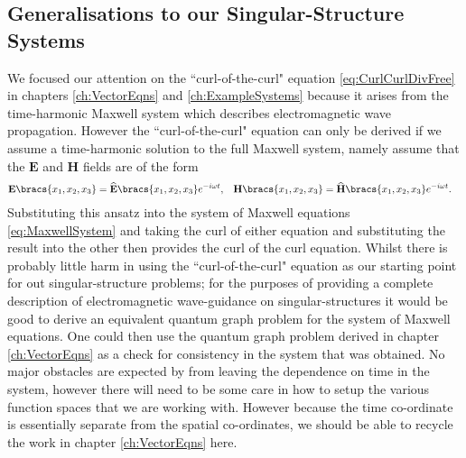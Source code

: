 \subsection{Generalisations to our Singular-Structure Systems} \label{sec:ConcFutureMaxwell}
We focused our attention on the ``curl-of-the-curl" equation \eqref{eq:CurlCurlDivFree} in chapters \ref{ch:VectorEqns} and \ref{ch:ExampleSystems} because it arises from the time-harmonic Maxwell system which describes electromagnetic wave propagation.
However the ``curl-of-the-curl" equation can only be derived if we assume a time-harmonic solution to the full Maxwell system, namely assume that the $\mathbf{E}$ and $\mathbf{H}$ fields are of the form
\begin{align*}
	\mathbf{E}\bracs{x_1,x_2,x_3} = \widehat{\mathbf{E}}\bracs{x_1,x_2,x_3}e^{-i\omega t}, 
	&\quad  \mathbf{H}\bracs{x_1,x_2,x_3} = \widehat{\mathbf{H}}\bracs{x_1,x_2,x_3}e^{-i\omega t}.
\end{align*}
Substituting this ansatz into the system of Maxwell equations \eqref{eq:MaxwellSystem} and taking the curl of either equation and substituting the result into the other then provides the curl of the curl equation.
Whilst there is probably little harm in using the ``curl-of-the-curl" equation as our starting point for out singular-structure problems; for the purposes of providing a complete description of electromagnetic wave-guidance on singular-structures it would be good to derive an equivalent quantum graph problem for the system of Maxwell equations.
One could then use the quantum graph problem derived in chapter \ref{ch:VectorEqns} as a check for consistency in the system that was obtained.
No major obstacles are expected by from leaving the dependence on time in the system, however there will need to be some care in how to setup the various function spaces that we are working with.
However because the time co-ordinate is essentially separate from the spatial co-ordinates, we should be able to recycle the work in chapter \ref{ch:VectorEqns} here. \newline

